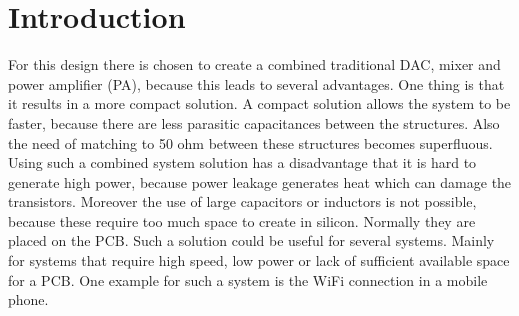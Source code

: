\section{Introduction} \label{sec:introduction}
For this design there is chosen to create a combined traditional DAC, mixer and power amplifier (PA), because this leads to several advantages. One thing is that it results in a more compact solution. A compact solution allows the system to be faster, because there are less parasitic capacitances between the structures. Also the need of matching to 50 ohm between these structures becomes superfluous. Using such a combined system solution has a disadvantage that it is hard to generate high power, because power leakage generates heat which can damage the transistors. Moreover the use of large capacitors or inductors is not possible, because these require too much space to create in silicon. Normally they are placed on the PCB.
Such a solution could be useful for several systems. Mainly for systems that require high speed, low power or lack of sufficient available space for a PCB. One example for such a system is the WiFi connection in a mobile phone.
